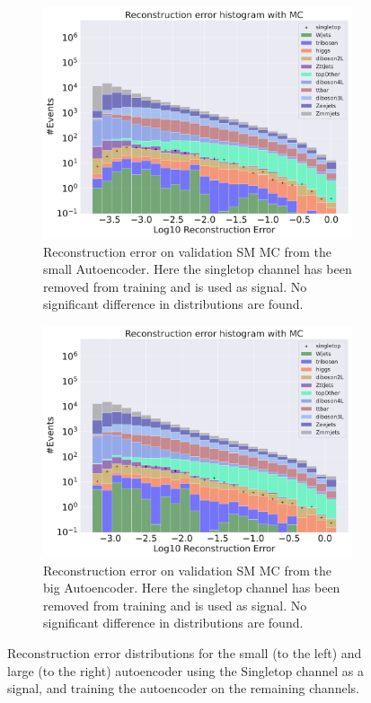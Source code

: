 \begin{figure}[h!]
    \centering
    \begin{subfigure}{.45\textwidth}
        \includegraphics[width=\textwidth]{Figures/AE_testing/small/b_data_recon_big_rm3_feats_sig_singletop.pdf}
        \caption{Reconstruction error on validation SM MC from the small Autoencoder. Here the singletop channel has been removed from training and 
        is used as signal. No significant difference in distributions are found. }
        \label{fig:ae_small_singletop}
    \end{subfigure}
    \hfill
    \begin{subfigure}{.45\textwidth}
        \includegraphics[width=\textwidth]{Figures/AE_testing/big/b_data_recon_big_rm3_feats_sig_singletop.pdf}
        \caption{Reconstruction error on validation SM MC from the big Autoencoder. Here the singletop channel has been removed from training and 
        is used as signal. No significant difference in distributions are found. }
        \label{fig:ae_big_singletop}
    \end{subfigure}
    \hfill
    \caption[Reconstruction error using Singletop channel as signal]{Reconstruction error distributions for the small (to the left) and large (to the right) autoencoder using the Singletop channel as a signal, and 
    training the autoencoder on the remaining channels. } 
    \label{fig:ae_big_channel_2}
\end{figure}

